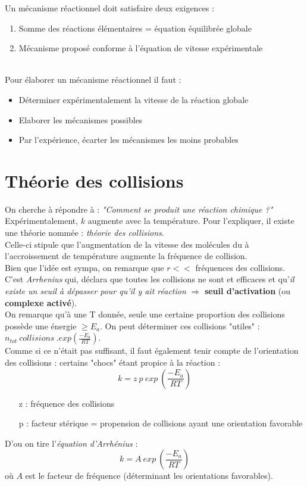 \documentclass	[11pt, a4paper, openany]{book}
\begin{document}
Un mécanisme réactionnel doit satisfaire deux exigences :
\begin{enumerate}
	\item Somme des réactions élémentaires = équation équilibrée globale
	\item Mécanisme proposé conforme à l'équation de vitesse expérimentale
\end{enumerate}\ \\
Pour élaborer un mécanisme réactionnel il faut :
\begin{itemize}
	\item Déterminer expérimentalement la vitesse de la réaction globale
	\item Elaborer les mécanismes possibles
	\item Par l'expérience, écarter les mécanismes les moins probables
\end{itemize}


\section{Théorie des collisions}
On cherche à répondre à : \textit{"Comment se produit une réaction chimique ?"}\\
Expérimentalement, $k$ augmente avec la température. Pour l'expliquer, il existe une théorie nommée : \textit{théorie des collisions}.\\

Celle-ci stipule que l'augmentation de la vitesse des molécules du à l'accroissement de température augmente la fréquence de collision.\\

Bien que l'idée est sympa, on remarque que $r <<$ fréquences des collisions. C'est \textit{Arrhenius} qui, déclara que toutes les collisions ne sont et efficaces et qu'\textit{il existe un seuil à dépasser pour qu'il y ait réaction} $\Rightarrow$ \textbf{seuil d'activation} (ou \textbf{complexe activé}).\\

On remarque qu'à une T donnée, seule une certaine proportion des collisions possède une énergie $\geq E_a$. On peut déterminer ces collisions "utiles" : $n_{tot}\ collisions\ . exp(\frac{-E_a}{RT})$.\\

Comme si ce n'était pas suffisant, il faut également tenir compte de l'orientation des collisions : certains "chocs" étant propice à la réaction :
$$k = z\ p\ exp\ (\frac{-E_a}{RT})$$
\begin{itemize}
	\item[z] : fréquence des collisions
	\item[p] : facteur stérique = propension de collisions ayant une orientation favorable
\end{itemize}
D'ou on tire l'\textit{équation d'Arrhénius} :
$$k = A\ exp\ (\frac{-E_a}{RT})$$
où $A$ est le facteur de fréquence (déterminant les orientations favorables).
\end{document}
